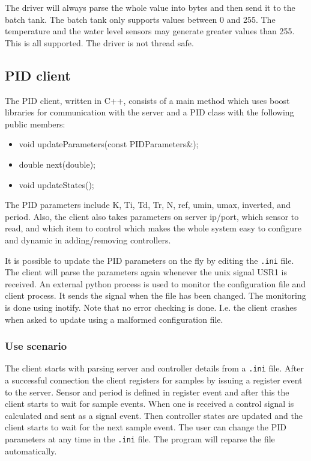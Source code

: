 \documentclass{article}
\begin{document}
The driver will always parse the whole value into bytes and then send it to the
batch tank. The batch tank only supports values between 0 and 255. The
temperature and the water level sensors may generate greater values than 255.
This is all supported. The driver is not thread safe.


\subsection{PID client}
The PID client, written in C++, consists of a main method which uses boost
libraries for communication with the server and a PID class with the following
public members:
\begin{itemize}
\item{void updateParameters(const PIDParameters\&);}
\item{double next(double);}
\item{void updateStates();}
\end{itemize}

The PID parameters include K, Ti, Td, Tr, N, ref, umin, umax, inverted, and 
period. Also, the client also takes parameters on server ip/port, which sensor
to read, and which item to control which makes the whole system easy to
configure and dynamic in adding/removing controllers.

It is possible to update the PID parameters on the fly by editing the 
\verb+.ini+ file.
The client will parse the parameters again whenever the unix signal USR1 is
received. An external python process is used to monitor the configuration file
and client process. It sends the signal when the file has been changed. The
monitoring is done using inotify.
Note that no error checking is done. I.e. the client crashes when asked
to update using a malformed configuration file. 

\subsubsection{Use scenario}
The client starts with parsing server and controller details from a
\verb+.ini+ file. After a successful connection the client registers for
samples by issuing a register event to the server. Sensor and period
is defined in register event and after this the client starts to wait
for sample events. When one is received a control signal is calculated
and sent as a signal event. Then controller states are updated and the
client starts to wait for the next sample event. The user can change the
PID parameters at any time in the \verb+.ini+ file. The program will 
reparse the file automatically.
 
\end{document}
